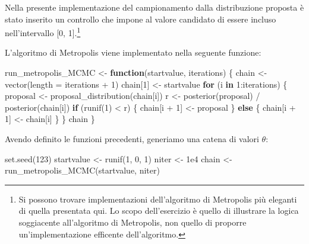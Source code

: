 \documentclass[
  10pt,
  italian,
  a4paper,
  extrafontsizes,onecolumn,openright
  ]{memoir}
\newenvironment{Shaded}{\begin{snugshade}}{\end{snugshade}}
\newcommand{\AttributeTok}[1]{\textcolor[rgb]{0.77,0.63,0.00}{#1}}
\newcommand{\ControlFlowTok}[1]{\textcolor[rgb]{0.13,0.29,0.53}{\textbf{#1}}}
\newcommand{\DecValTok}[1]{\textcolor[rgb]{0.00,0.00,0.81}{#1}}
\newcommand{\FloatTok}[1]{\textcolor[rgb]{0.00,0.00,0.81}{#1}}
\newcommand{\FunctionTok}[1]{\textcolor[rgb]{0.00,0.00,0.00}{#1}}
\newcommand{\NormalTok}[1]{#1}
\newcommand{\OtherTok}[1]{\textcolor[rgb]{0.56,0.35,0.01}{#1}}
\newcommand{\SpecialCharTok}[1]{\textcolor[rgb]{0.00,0.00,0.00}{#1}}
\begin{document}
\noindent 
Nella presente implementazione del campionamento dalla distribuzione proposta è stato inserito un controllo che impone al valore candidato di essere incluso nell'intervallo {[}0, 1{]}.\footnote{Si possono trovare implementazioni dell'algoritmo di Metropolis più eleganti di quella presentata qui. Lo scopo dell'esercizio è quello di illustrare la logica soggiacente all'algoritmo di Metropolis, non quello di proporre un'implementazione efficente dell'algoritmo.}

L'algoritmo di Metropolis viene implementato nella seguente funzione:

\begin{Shaded}
\begin{Highlighting}[]
\NormalTok{run\_metropolis\_MCMC }\OtherTok{\textless{}{-}} \ControlFlowTok{function}\NormalTok{(startvalue, iterations) \{}
\NormalTok{  chain }\OtherTok{\textless{}{-}} \FunctionTok{vector}\NormalTok{(}\AttributeTok{length =}\NormalTok{ iterations }\SpecialCharTok{+} \DecValTok{1}\NormalTok{)}
\NormalTok{  chain[}\DecValTok{1}\NormalTok{] }\OtherTok{\textless{}{-}}\NormalTok{ startvalue}
  \ControlFlowTok{for}\NormalTok{ (i }\ControlFlowTok{in} \DecValTok{1}\SpecialCharTok{:}\NormalTok{iterations) \{}
\NormalTok{    proposal }\OtherTok{\textless{}{-}} \FunctionTok{proposal\_distribution}\NormalTok{(chain[i])}
\NormalTok{    r }\OtherTok{\textless{}{-}} \FunctionTok{posterior}\NormalTok{(proposal) }\SpecialCharTok{/} \FunctionTok{posterior}\NormalTok{(chain[i])}
    \ControlFlowTok{if}\NormalTok{ (}\FunctionTok{runif}\NormalTok{(}\DecValTok{1}\NormalTok{) }\SpecialCharTok{\textless{}}\NormalTok{ r) \{}
\NormalTok{      chain[i }\SpecialCharTok{+} \DecValTok{1}\NormalTok{] }\OtherTok{\textless{}{-}}\NormalTok{ proposal}
\NormalTok{    \} }\ControlFlowTok{else}\NormalTok{ \{}
\NormalTok{      chain[i }\SpecialCharTok{+} \DecValTok{1}\NormalTok{] }\OtherTok{\textless{}{-}}\NormalTok{ chain[i]}
\NormalTok{    \}}
\NormalTok{  \}}
\NormalTok{  chain}
\NormalTok{\}}
\end{Highlighting}
\end{Shaded}

Avendo definito le funzioni precedenti, generiamo una catena di valori \(\theta\):

\begin{Shaded}
\begin{Highlighting}[]
\FunctionTok{set.seed}\NormalTok{(}\DecValTok{123}\NormalTok{)}
\NormalTok{startvalue }\OtherTok{\textless{}{-}} \FunctionTok{runif}\NormalTok{(}\DecValTok{1}\NormalTok{, }\DecValTok{0}\NormalTok{, }\DecValTok{1}\NormalTok{)}
\NormalTok{niter }\OtherTok{\textless{}{-}} \FloatTok{1e4}
\NormalTok{chain }\OtherTok{\textless{}{-}} \FunctionTok{run\_metropolis\_MCMC}\NormalTok{(startvalue, niter)}
\end{Highlighting}
\end{Shaded}
\end{document}
